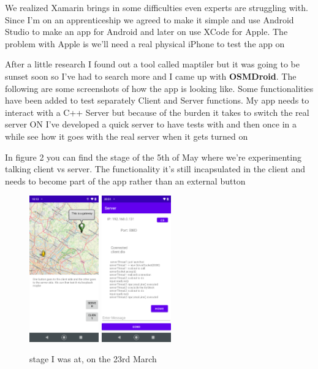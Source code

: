 \documentclass[a4paper,12pt]{article}
\begin{document}
\noindent We realized Xamarin brings in some difficulties even experts are struggling with. Since I'm on an apprenticeship we agreed to make it simple and use Android Studio to make an app for Android and later on use XCode for Apple. The problem with Apple is we'll need a real physical iPhone to test the app on

After a little research I found out a tool called maptiler but it was going to be sunset soon so I've had to search more and I came up with \textbf{OSMDroid}. The following are some screenshots of how the app is looking like. Some functionalities have been added to test separately Client and Server functions. My app needs to interact with a C++ Server but because of the burden it takes to switch the real server ON I've developed a quick server to have tests with and then once in a while see how it goes with the real server when it gets turned on

\clearpage

In figure 2 you can find the stage of the 5th of May where we're experimenting talking client vs server. The functionality it's still incapsulated in the client and needs to become part of the app rather than an external button
\begin{figure}
\includegraphics[width=3cm]{./current_status_g7.PNG}
\includegraphics[width=3cm]{./server_g7.PNG}
\caption{stage I was at, on the 23rd March}\label{wrap-fig:2}
\end{figure}
\end{document}
